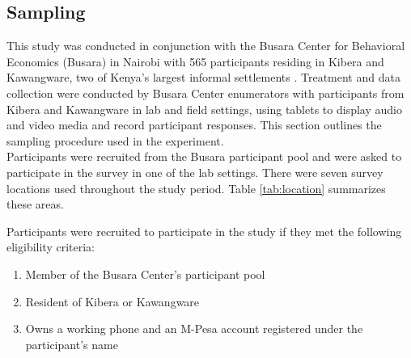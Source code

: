 \documentclass[11pt, a4paper]{article}\usepackage[]{graphicx}\usepackage[]{color}
\begin{document}
    \subsection{Sampling}

        This study was conducted in conjunction with the Busara Center for Behavioral Economics (Busara) in Nairobi with 565 participants residing in Kibera and Kawangware, two of Kenya's largest informal settlements \parencite{haushofer_methodology_2014}. Treatment and data collection were conducted by Busara Center enumerators with participants from Kibera and Kawangware in lab and field settings, using tablets to display audio and video media and record participant responses. This section outlines the sampling procedure used in the experiment. \\

        Participants were recruited from the Busara participant pool and were asked to participate in the survey in one of the lab settings. There were seven survey locations used throughout the study period. Table \ref{tab:location} summarizes these areas.

        \begin{table}[h]
        \centering
        \caption{Survey locations}
        \label{tab:location}
        \end{table}

        Participants were recruited to participate in the study if they met the following eligibility criteria:

        \begin{enumerate}
        \itemsep0em
            \item Member of the Busara Center's participant pool
            \item Resident of Kibera or Kawangware
            \item Owns a working phone and an M-Pesa account registered under the participant's name
        \end{enumerate}
\end{document}
